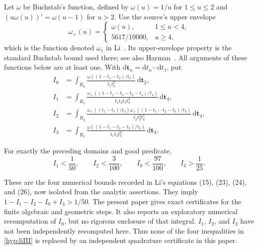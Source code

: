 Let $\omega$ be Buchstab's function, defined by
$\omega(u)=1/u$ for $1\le u\le2$ and
$(u\omega(u))'=\omega(u-1)$ for $u>2$. Use the source's upper
envelope
\[
 \omega_+(u)=
 \begin{cases}
  \omega(u),&1\le u<4,\\
  5617/10000,&u\ge4,
 \end{cases}
\]
which is the function denoted $\omega_1$ in Li~\cite[Section~7]{LiIII}.
Its upper-envelope property is the standard Buchstab bound used there;
see also Harman~\cite{Harman}.
All arguments of these functions below are at least one.
With $\mathrm d\boldsymbol t_n=\mathrm dt_n\cdots\mathrm dt_1$, put
\begin{align}
 I_0&=\int_{R_0}
       \frac{\omega((1-t_1-t_2)/t_2)}{t_1t_2^2}
                    \,\mathrm d\boldsymbol t_2,\label{eq:input-I0}\\
 I_1&=\int_{R_1}
       \frac{\omega_+((1-t_1-t_2-t_3-t_4)/t_4)}
                         {t_1t_2t_3t_4^2}
                    \,\mathrm d\boldsymbol t_4,\label{eq:input-I1}\\
 I_2&=\int_{R_2}
       \frac{\omega_+((t_1-t_4)/t_4)
             \omega_+((1-t_1-t_2-t_3)/t_3)}{t_2t_3^2t_4^2}
                    \,\mathrm d\boldsymbol t_4,\label{eq:input-I2}\\
 I_3&=\int_{R_3}
       \frac{\omega((1-t_1-t_2-t_3)/t_3)}{t_1t_2t_3^2}
                    \,\mathrm d\boldsymbol t_3.\label{eq:input-I3}
\end{align}

\begin{hypothesis}
\label{hyp:liIII}
For exactly the preceding domains and good predicate,
\[
             I_1<\frac1{50},\qquad I_2<\frac3{100},\qquad
             I_0<\frac{97}{100},\qquad I_3>\frac1{25}.
\]
\end{hypothesis}

These are the four numerical bounds recorded in Li's equations
(15), (23), (24), and (26), now isolated from the analytic assertions.
They imply $1-I_1-I_2-I_0+I_3>1/50$.
The present paper gives exact certificates for the finite algebraic
and geometric steps. It also reports an exploratory numerical
recomputation of $I_0$, but no rigorous enclosure of that integral.
$I_1$, $I_2$, and $I_3$ have not been independently recomputed here.
Thus none of the four inequalities in \cref{hyp:liIII} is replaced
by an independent quadrature certificate in this paper.


